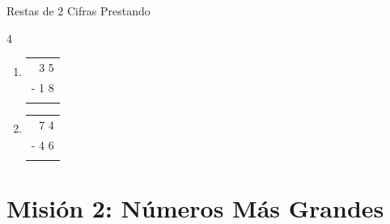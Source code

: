 \documentclass[12pt, letterpaper]{article}
\newcommand{\boxfill}[1][1.2cm]{\tcbox[on line, size=minimal, colframe=valdark!80, colback=white, boxrule=0.5pt, arc=1mm, boxsep=2pt, left=2pt, right=2pt, top=2pt, bottom=2pt]{\makebox[#1]{\vphantom{M}}}}
\begin{document}
\begin{practica}{Restas de 2 Cifras Prestando }
\begin{multicols}{4}
\begin{enumerate}[itemsep=1cm]
				\item 
				\begin{tabular}{r}
					3 5 \\
					- 1 8 \\
					\hline
					\boxfill[1.2cm]
				\end{tabular}
				
				\item 
				\begin{tabular}{r}
					7 4 \\
					- 4 6 \\
					\hline
					\boxfill[1.2cm]
				\end{tabular}
			\end{enumerate}
		\end{multicols}
	\end{practica}
	
	\section*{Misión 2: Números Más Grandes}
	
\end{document}
